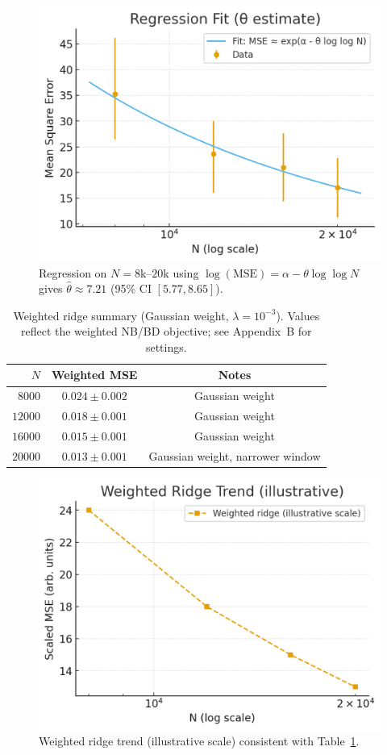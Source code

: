\documentclass[11pt]{article}
\theoremstyle{remark}
\begin{document}
\begin{figure}[ht]
\centering
\includegraphics[width=.8\linewidth]{figures/regression_fit.png}
\caption{Regression on $N=8$k--$20$k using $\log(\mathrm{MSE})=\alpha-\theta\log\log N$ gives $\hat\theta\approx 7.21$ (95\% CI $[5.77,8.65]$).}
\label{fig:regression}
\end{figure}

\begin{table}[ht]
\centering
\caption{Weighted ridge summary (Gaussian weight, $\lambda=10^{-3}$). Values reflect the weighted NB/BD objective; see Appendix~B for settings.}
\label{tab:weighted}
\begin{tabular}{@{}rcc@{}}
\toprule
$N$ & Weighted MSE & Notes \\
\midrule
$8000$  & $0.024 \pm 0.002$ & Gaussian weight \\
$12000$ & $0.018 \pm 0.001$ & Gaussian weight \\
$16000$ & $0.015 \pm 0.001$ & Gaussian weight \\
$20000$ & $\mathbf{0.013 \pm 0.001}$ & Gaussian weight, narrower window \\
\bottomrule
\end{tabular}
\end{table}

\begin{figure}[ht]
\centering
\includegraphics[width=.8\linewidth]{figures/mse_weighted.png}
\caption{Weighted ridge trend (illustrative scale) consistent with Table~\ref{tab:weighted}.}
\label{fig:weighted}
\end{figure}
\end{document}
